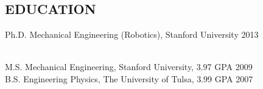 \documentclass[line,margin]{res}
\newcommand{\CVOnly}[1]{}
\newcommand{\CVOnly}[1]{#1}
\begin{document}
\address{469 Homer Ave, Palo Alto, CA 94301}
\address{650.762.6844}
\address{adamleeper@gmail.com} 
\address{www.adamleeper.com}

 
\begin{resume}
 
\section{EDUCATION}
\vspace{1.0pc}
Ph.D. Mechanical Engineering (Robotics), Stanford University 
\hfill 2013%
\CVOnly{ {\small
\\[0.0pc]{\bf Advisor:} Prof. Kenneth Salisbury
\\[0.0pc]{\bf Thesis:} Robot Telemanipulation in Unstructured Environments: Sensors, Algorithms, Interfaces.
\\[-0.6pc]} }
%
\\[0.0pc]M.S. Mechanical Engineering, Stanford University, 3.97 GPA \hfill  2009 
\\[0.0pc] B.S. Engineering Physics, The University of Tulsa, 3.99 GPA \hfill 2007 
%
%

\end{resume}
\end{document}
